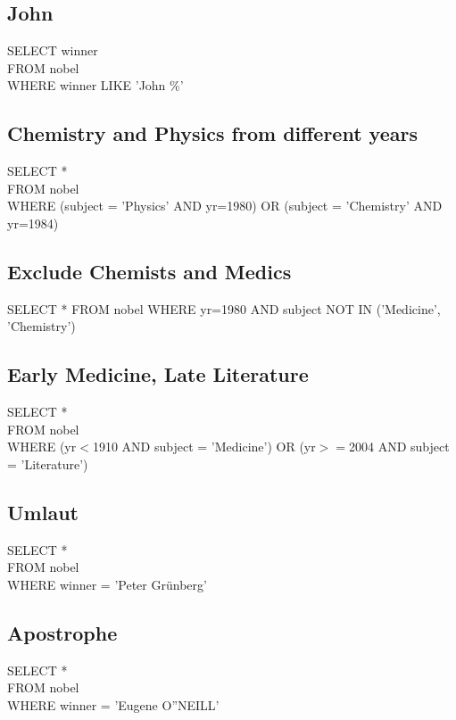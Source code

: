 \documentclass[10pt, oneside]{article}
\begin{document}
\subsection{John}

SELECT winner\\
FROM nobel\\
WHERE winner LIKE 'John \%'\\

\subsection{Chemistry and Physics from different years}

SELECT *\\
FROM nobel\\
WHERE (subject = 'Physics' AND yr=1980) OR (subject = 'Chemistry' AND yr=1984)\\

\subsection{Exclude Chemists and Medics}

SELECT *
FROM nobel
WHERE yr=1980 AND subject NOT IN ('Medicine', 'Chemistry')

\subsection{Early Medicine, Late Literature}

SELECT *\\
FROM nobel\\
WHERE (yr$<$1910 AND subject = 'Medicine') OR (yr$>=$2004 AND subject = 'Literature')\\

\subsection{Umlaut}

SELECT *\\
FROM nobel\\
WHERE winner = 'Peter \color{red}Grünberg\color{black}'\\

\subsection{Apostrophe}

SELECT *\\
FROM nobel\\
WHERE winner = 'Eugene O\color{red}''\color{black}NEILL'\\
\end{document}
